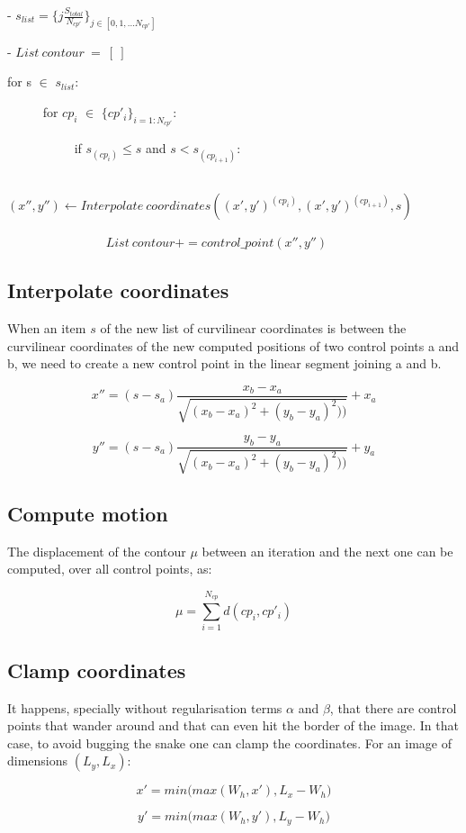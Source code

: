 \documentclass[24pt]{article}
\begin{document}
- $s_{list} = \{j \frac{S_{total}}{N_{cp'}} \}_{j \in [0,1, ...N_{cp'}]} $

- $List ~contour~ =~ [~]$

for s $\in$ $s_{list}$:

~~~~~ for $cp_i$ $\in$ $\{cp'_i\}_{i= 1:N_{cp'}}$: 

~~~~~~~~~~ if $s_{(cp_{i})} \leq s$  and $s < s_{(cp_{i+1})} :$

~~~~~~~~~~~~~~~$(x'', y'') \leftarrow Interpolate ~coordinates ((x',y')^{(cp_{i})}, (x',y')^{(cp_{i+1})} , s  )$

~~~~~~~~~~~~~~~ $List ~contour += control\_point(x'', y'')$

     
\subsection{Interpolate coordinates}
	When an item $s$ of the new list of curvilinear coordinates is between the curvilinear coordinates of the new computed positions of two control points a and b, we need to create a new control point in the linear segment joining a and b. 
	
	
$$ x'' =  (s-s_a)\frac{x_b - x_a}{\sqrt{ (x_b - x_a)^2 + (y_b - y_a)^2 ))  } } + x_a    $$	
	
$$ y'' =  (s-s_a)\frac{y_b - y_a}{\sqrt{ (x_b - x_a)^2 + (y_b - y_a)^2 ))  } } + y_a    $$		
	
\subsection{Compute motion}

The displacement of the contour $\mu$ between an iteration and the next one can be computed, over all control points, as: 

$$ \mu = \sum_{i = 1}^{N_{cp}} d(cp_i , cp'_{i}) $$ 




\subsection{Clamp coordinates}
It happens, specially without regularisation terms $\alpha$ and $\beta$, that there are control points that wander around and that can even hit the border of the image. In that case, to avoid bugging the snake one can clamp the coordinates. For an image of dimensions $(L_y, L_x)$: 

 $$ x' = min\Big(max(W_h, x'), L_x - W_h \Big)  $$ 


 $$ y' = min\Big(max(W_h, y'), L_y - W_h \Big)  $$  
 
\end{document}
